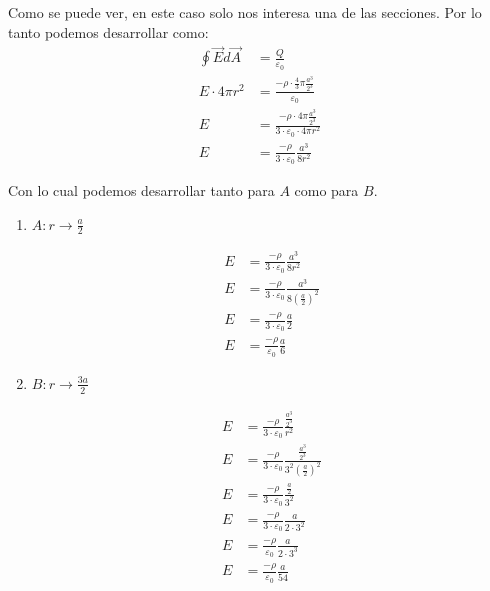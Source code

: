 \documentclass{report}
\begin{document}

Como se puede ver, en este caso solo nos interesa una de las secciones. Por lo tanto podemos desarrollar como:
\begin{align*}
  \oint \vec{E} d\vec{A} &= \frac{Q}{\varepsilon_0} \\
  E \cdot 4 \pi r^2 &= \frac{-\rho \cdot \frac{4}{3}\pi \frac{a^3}{2^3}}{\varepsilon_0}\\
  E &= \frac{-\rho \cdot 4 \pi \frac{a^3}{2^3}}{3 \cdot \varepsilon_0 \cdot 4 \pi r^2}\\
  E &= \frac{-\rho}{3\cdot \varepsilon_0} \frac{a^3}{8r^2}
\end{align*}

Con lo cual podemos desarrollar tanto para $A$ como para $B$.
\begin{enumerate}
  \item $A: r \to \frac{a}{2}$

    \begin{align*}
      E &= \frac{-\rho}{3\cdot \varepsilon_0} \frac{a^3}{8r^2}\\
      E &= \frac{-\rho}{3\cdot \varepsilon_0} \frac{a^3}{8\left( \frac{a}{2} \right)^2}\\
      E &= \frac{-\rho}{3\cdot \varepsilon_0} \frac{a}{2}\\
      E &= \frac{-\rho}{\varepsilon_0} \frac{a}{6}
    \end{align*}
  \item $B: r \to \frac{3 a}{2}$

    \begin{align*}
      E &= \frac{-\rho}{3\cdot \varepsilon_0} \frac{\frac{a^3}{2^3}}{r^2}\\
      E &= \frac{-\rho}{3\cdot \varepsilon_0} \frac{\frac{a^3}{2^3}}{3^2 \left( \frac{a}{2} \right)^2}\\
      E &= \frac{-\rho}{3\cdot \varepsilon_0} \frac{\frac{a}{2}}{3^2}\\
      E &= \frac{-\rho}{3\cdot \varepsilon_0} \frac{a}{2 \cdot 3^2}\\
      E &= \frac{-\rho}{\varepsilon_0} \frac{a}{2 \cdot 3^3}\\
      E &= \frac{-\rho}{\varepsilon_0} \frac{a}{54}
    \end{align*}
\end{enumerate}
\end{document}

